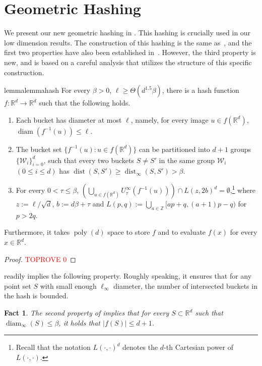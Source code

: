 \documentclass[11pt,letterpaper]{article}
\theoremstyle{plain}
\newtheorem{fact}[theorem]{Fact}
\theoremstyle{definition}
\theoremstyle{remark}
\def\ZZ{{\mathbb{Z}}}
\DeclareMathOperator{\poly}{poly}
\DeclareMathOperator{\dist}{dist}
\DeclareMathOperator{\diam}{diam}
\begin{document}
     \section{Geometric Hashing}
\label{sec:hash}

We present our new geometric hashing in .
This hashing is crucially used in our low dimension results.
The construction of this hashing is the same as~\cite[Theorem 5.3]{CJKVY22},
and the first two properties have also been established in~\cite{CJKVY22}.
However, the third property is new, and is based on a careful analysis that utilizes the structure of this specific construction.
\begin{restatable}{lemma}{lemmahash}
    \label{lemma:hash}
    For every $\beta>0$, $\ell \geq \Theta(d^{1.5} \beta)$, there is a hash function $f : \mathbb{R}^{d} \to \mathbb{R}^{d}$ such that the following holds.
    \begin{enumerate}
        \item  Each bucket has diameter at most $\ell$, namely, for every image $u \in f(\mathbb{R}^{d})$, $\diam(f^{-1}(u)) \leq \ell$.
        \item  The bucket set $\{ f^{-1}(u) : u \in f(\mathbb{R}^d) \}$ can be partitioned into $d + 1$ groups $\{ \mathcal{W}_i \}_{i=0}^d$,
        such that every two buckets $S \neq S'$ in the same group $\mathcal{W}_i$ $(0 \leq i \leq d)$ has $\dist(S, S') \geq \dist_\infty(S, S') > \beta$.
\item  For every $0<\tau\leq \beta$, $\left(\bigcup_{u \in f(\mathbb{R}^{d})} U^\infty_\tau(f^{-1}(u)) \right) \cap L(z, 2b)^d = \emptyset$,\footnote{Recall that the notation $L(\cdot, \cdot)^d$ denotes the $d$-th Cartesian power of $L(\cdot, \cdot)$.}
    where $z:=\ell/ \sqrt{d}$, $b := d\beta +\tau$ and $L(p, q):= \bigcup_{a\in \ZZ} [ap + q, (a+1)p - q)$ for $p > 2q$.
    \end{enumerate} 
    Furthermore, it takes $\poly(d)$ space to store $f$ and to evaluate $f(x)$ for every $x \in \mathbb{R}^d$.
\end{restatable}
\begin{proof}\textcolor{red}{TOPROVE 0}\end{proof}

 readily implies the following property.
Roughly speaking, it ensures that for any point set $S$ with small enough $\ell_\infty$ diameter, the number of intersected buckets in the hash is bounded.
\begin{fact}
    \label{fact:consistent_hash}
    The second property of 
    implies that for every $S \subset \mathbb{R}^d$ such that $\diam_\infty(S) \leq \beta$,
    it holds that $|f(S)| \leq d + 1$.
\end{fact}
\end{document}
